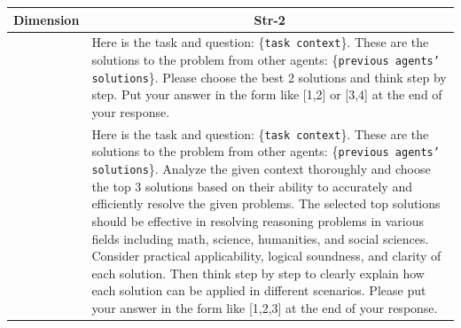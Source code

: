 \vspace{-2mm}


\begin{table}[H]
\centering
\begin{center}

\begin{tabular}{ m{1.5cm} | m{14cm}}
\toprule
\textbf{Dimension}  & 
\multicolumn{1}{c}{Str-2}\\
 \midrule

\centering{\textbf{Default Prompt}}  & 
Here is the task and question: \{\texttt{task context}\}. \newline
These are the solutions to the problem from other agents: \{\texttt{previous agents' solutions}\}. \newline
\newline
Please choose the best 2 solutions and think step by step. Put your answer in the form like [1,2] or [3,4] at the end of your response.\\
 \midrule

 \centering{\textbf{Optimized Prompt}}  & 

Here is the task and question: \{\texttt{task context}\}. \newline
These are the solutions to the problem from other agents: \{\texttt{previous agents' solutions}\}. \newline
\newline
Analyze the given context thoroughly and choose the top 3 solutions based on their ability to accurately and efficiently resolve the given problems.\newline 
The selected top solutions should be effective in resolving reasoning problems in various fields including math, science, humanities, and social sciences. \newline
Consider practical applicability, logical soundness, and clarity of each solution. \newline
Then think step by step to clearly explain how each solution can be applied in different scenarios. \newline
Please put your answer in the form like [1,2,3] at the end of your response. \\ 

\bottomrule
\end{tabular}
\end{center}
\end{table}






